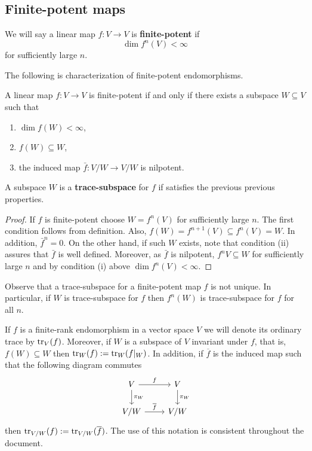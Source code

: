 \subsection{Finite-potent maps}
\begin{definition}\label{def:finite-potent}
	We will say a linear map $f\colon V \to V$ is \textbf{finite-potent} if
	\[
		\dim f^{n}(V) < \infty
	\]
	for sufficiently large $n$.
\end{definition}
The following is characterization of finite-potent endomorphisms.
\begin{lemma}\label{lemm:characterization-of-finite-potent-maps}
	A linear map $f\colon V \to V$ is finite-potent if and only if there exists a subspace $W \subseteq V$ such that
	\begin{enumerate}[label = (\roman*)]
		\item $\dim f(W) < \infty$,
		\item $f(W) \subseteq W$,
		\item the induced map $\bar{f}\colon V/W \to V/W$ is nilpotent.
	\end{enumerate}
	A subspace $W$ is a \textbf{trace-subspace} for $f$ if satisfies the previous previous properties.   
\end{lemma}
\begin{proof}
	If $f$ is finite-potent choose $W = f^{n}(V)$ for sufficiently large $n$. The first condition follows from definition. Also, $f(W) = f^{n+1}(V) \subseteq f^{n}(V) = W$. In addition, $\bar{f}^{n} = 0$. On the other hand, if such $W$ exists, note that condition (ii) assures that $\bar{f}$ is well defined. Moreover, as $\bar{f}$ is nilpotent, $f^{n}V \subseteq W$ for sufficiently large $n$ and by condition (i) above $\dim f^{n}(V) < \infty$.
\end{proof}
Observe that a trace-subspace for a finite-potent map $f$ is not unique. In particular, if $W$ is trace-subspace for $f$ then $f^{n}(W)$ is trace-subspace for $f$ for all $n$.
\begin{notation}\label{not:trace}
	If $f$ is a finite-rank endomorphism in a vector space $V$ we will denote its ordinary trace by $\operatorname{tr}_{V}(f)$. Moreover, if $W$ is a subspace of $V$ invariant under $f$, that is, $f(W) \subseteq W$ then $\operatorname{tr}_{W}(f) := \operatorname{tr}_{W}(f\lvert_{W})$. In addition, if $\overline{f}$ is the induced map such that the following diagram commutes
	\[
	\begin{tikzcd}
		V \arrow[r, "f"] \arrow[d, "\pi_{W}"] & V \arrow[d, "\pi_{W}"] \\
		V/W \arrow[r, "\overline{f}"] & V/W
	\end{tikzcd} 
	\]
	then $\operatorname{tr}_{V/W}(f) := \operatorname{tr}_{V/W}(\overline{f})$. The use of this notation is consistent throughout the document. 
\end{notation}
